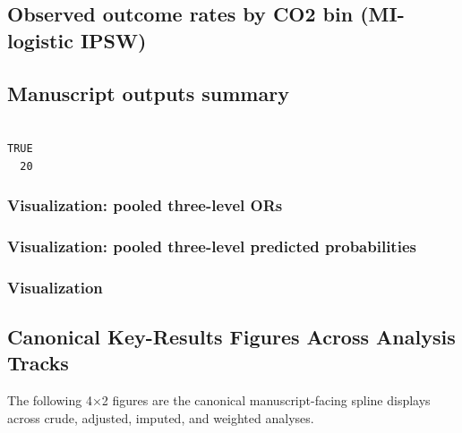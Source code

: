 \documentclass[
  11pt,
  letterpaper,
  DIV=11,
  numbers=noendperiod]{scrartcl}
\begin{document}
\subsection{Observed outcome rates by CO2 bin (MI-logistic
IPSW)}\label{observed-outcome-rates-by-co2-bin-mi-logistic-ipsw}

\subsection{Manuscript outputs
summary}\label{manuscript-outputs-summary}

\begin{verbatim}

TRUE 
  20 
\end{verbatim}

\subsubsection{Visualization: pooled three-level
ORs}\label{visualization-pooled-three-level-ors}

\subsubsection{Visualization: pooled three-level predicted
probabilities}\label{visualization-pooled-three-level-predicted-probabilities}

\FloatBarrier\nopagebreak

\par

\noindent

\subsubsection{Visualization}\label{visualization}

\subsection{Canonical Key-Results Figures Across Analysis
Tracks}\label{canonical-key-results-figures-across-analysis-tracks}

The following 4×2 figures are the canonical manuscript-facing spline
displays across crude, adjusted, imputed, and weighted analyses.

\FloatBarrier\nopagebreak

\par

\noindent
\end{document}
